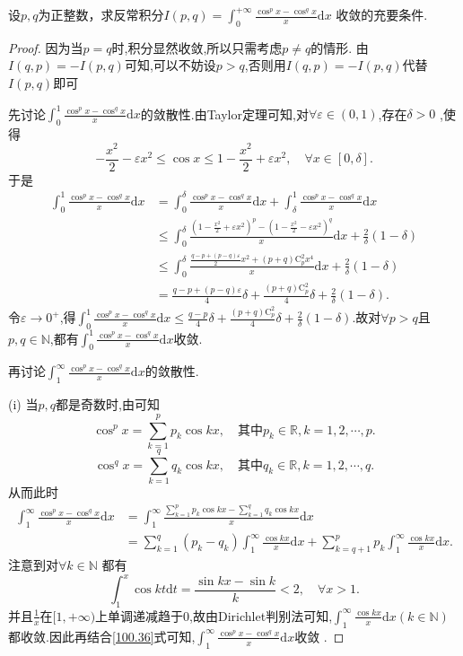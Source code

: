 \documentclass[../../main.tex]{subfiles}
\begin{document}
\begin{example}
设\(p,q\)为正整数，求反常积分$I(p,q)=\int_{0}^{+\infty}\frac{\cos^{p}x - \cos^{q}x}{x}\mathrm{d}x$
收敛的充要条件.
\end{example}
\begin{proof}
因为当$p=q$时,积分显然收敛,所以只需考虑$p\ne q$的情形. 由$I(q,p) =-I(p,q)$可知,可以不妨设$p>q$,否则用$I(q,p) =-I(p,q)$代替$I(p,q)$即可

先讨论$\int_0^1{\frac{\cos ^px-\cos ^qx}{x}\mathrm{d}x}$的敛散性.由Taylor定理可知,对$\forall \varepsilon \in (0,1)$,存在$\delta >0$ ,使得  
\[
-\frac{x^2}{2}-\varepsilon x^2\leqslant \cos x\leqslant 1-\frac{x^2}{2}+\varepsilon x^2 ,\quad \forall x\in [0,\delta].
\]  
于是  
\begin{align*}
\int_0^1{\frac{\cos ^px-\cos ^qx}{x}\mathrm{d}x}&=\int_0^{\delta}{\frac{\cos ^px-\cos ^qx}{x}\mathrm{d}x}+\int_{\delta}^1{\frac{\cos ^px-\cos ^qx}{x}\mathrm{d}x}\\
&\leqslant \int_0^{\delta}{\frac{(1-\frac{x^2}{2}+\varepsilon x^2)^p-(1-\frac{x^2}{2}-\varepsilon x^2)^q}{x}\mathrm{d}x}+\frac{2}{\delta}(1-\delta)\\
&\leqslant \int_0^{\delta}{\frac{\frac{q-p+(p-q)\varepsilon}{2}x^2+(p+q)\mathrm{C}_{p}^{2}x^4}{x}\mathrm{d}x}+\frac{2}{\delta}(1-\delta)\\
&=\frac{q-p+(p-q)\varepsilon}{4}\delta +\frac{(p+q)\mathrm{C}_{p}^{2}}{4}\delta +\frac{2}{\delta}(1-\delta).
\end{align*}  
令$\varepsilon \rightarrow 0^+$,得$\int_0^1{\frac{\cos ^px-\cos ^qx}{x}\mathrm{d}x}\leqslant \frac{q-p}{4}\delta +\frac{(p+q)\mathrm{C}_{p}^{2}}{4}\delta +\frac{2}{\delta}(1-\delta)$.故对$\forall p>q$且$p,q\in \mathbb{N}$,都有$\int_0^1{\frac{\cos ^px-\cos ^qx}{x}\mathrm{d}x}$收敛.

再讨论$\int_1^{\infty}{\frac{\cos ^px-\cos ^qx}{x}\mathrm{d}x}$的敛散性.

(i) 当$p,q$都是奇数时,由可知  
$$
\cos ^px=\sum_{k=1}^p{p_k\cos kx} ,\quad \text{其中}p_k\in \mathbb{R} , k=1,2,\cdots,p.
$$  
$$
\cos ^qx=\sum_{k=1}^q{q_k\cos kx} ,\quad \text{其中}q_k\in \mathbb{R} , k=1,2,\cdots,q.
$$  
从而此时  
\begin{align*}
\int_1^{\infty}{\frac{\cos ^px-\cos ^qx}{x}\mathrm{d}x}&=\int_1^{\infty}{\frac{\sum\limits_{k=1}^p{p_k\cos kx}-\sum\limits_{k=1}^q{q_k\cos kx}}{x}\mathrm{d}x}\\
&=\sum\limits_{k=1}^q{(p_k-q_k)\int_1^{\infty}{\frac{\cos kx}{x}\mathrm{d}x}}+\sum\limits_{k=q+1}^p{p_k\int_1^{\infty}{\frac{\cos kx}{x}\mathrm{d}x}} .\label{100.36}
\end{align*}  
注意到对$\forall k\in \mathbb{N}$ 都有  
$$
\int_1^x{\cos kt\mathrm{d}t}=\frac{\sin kx-\sin k}{k}<2 ,\quad \forall x>1.
$$  
并且$\frac{1}{x}$在$[1,+\infty)$上单调递减趋于0,故由Dirichlet判别法可知,$\int_1^{\infty}{\frac{\cos kx}{x}\mathrm{d}x}(k\in \mathbb{N})$都收敛.因此再结合\eqref{100.36}式可知,$\int_1^{\infty}{\frac{\cos ^px-\cos ^qx}{x}\mathrm{d}x}$收敛 . 


\end{proof}
\end{document}
